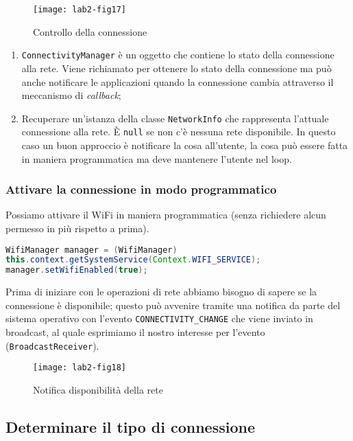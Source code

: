 \begin{figure*}[htbp]
        \centering
        \texttt{[image: lab2-fig17]}
        \caption[Controllo connessione]{Controllo della connessione}
        \label{img:lab2-fig17}
\end{figure*}

\begin{enumerate}
\item \texttt{ConnectivityManager} è un oggetto che contiene lo stato della
connessione alla rete. Viene richiamato per ottenere lo stato della connessione
ma può anche notificare le applicazioni quando la connessione cambia attraverso
il meccanismo di \textit{callback};
\item Recuperare un'istanza della classe \texttt{NetworkInfo} che rappresenta
l'attuale connessione alla rete. È \texttt{null} se non c'è nessuna rete
disponibile. In questo caso un buon approccio è notificare la cosa all'utente,
la cosa può essere fatta in maniera programmatica ma deve mantenere l'utente nel
loop.
\end{enumerate}

\subsubsection{Attivare la connessione in modo programmatico}

Possiamo attivare il WiFi in maniera programmatica (senza richiedere alcun
permesso in più rispetto a prima).

\begin{lstlisting}[language=Java]
WifiManager manager = (WifiManager)
this.context.getSystemService(Context.WIFI_SERVICE);
manager.setWifiEnabled(true);
\end{lstlisting}

Prima di iniziare con le operazioni di rete abbiamo bisogno di sapere se la
connessione è disponibile; questo può avvenire tramite una notifica da parte del
sistema operativo con l'evento \texttt{CONNECTIVITY\_CHANGE} che viene inviato
in broadcast, al quale esprimiamo il nostro interesse per l'evento
(\texttt{BroadcastReceiver}).

\begin{figure*}[htbp]
        \centering
        \texttt{[image: lab2-fig18]}
        \caption[Disponibilità rete]{Notifica disponibilità della rete}
        \label{img:lab2-fig18}
\end{figure*}

\subsection{Determinare il tipo di connessione}

